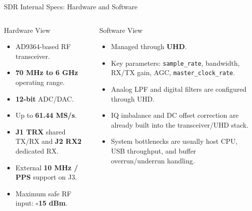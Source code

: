 \documentclass{beamer}
\begin{document}
\begin{frame}{SDR Internal Specs: Hardware and Software}
    \scriptsize
    \begin{columns}[T]
        \begin{block}{Hardware View}
            \begin{itemize}
                \item AD9364-based RF transceiver.
                \item \textbf{70 MHz to 6 GHz} operating range.
                \item \textbf{12-bit} ADC/DAC.
                \item Up to \textbf{61.44 MS/s}.
                \item \textbf{J1 TRX} shared TX/RX and \textbf{J2 RX2} dedicated RX.
                \item External \textbf{10 MHz / PPS} support on J3.
                \item Maximum safe RF input: \textbf{-15 dBm}.
            \end{itemize}
        \end{block}

        \begin{block}{Software View}
            \begin{itemize}
                \item Managed through \textbf{UHD}.
                \item Key parameters: \texttt{sample\_rate}, bandwidth, RX/TX gain, AGC, \texttt{master\_clock\_rate}.
                \item Analog LPF and digital filters are configured through UHD.
                \item IQ imbalance and DC offset correction are already built into the transceiver/UHD stack.
                \item System bottlenecks are usually host CPU, USB throughput, and buffer overrun/underrun handling.
            \end{itemize}
        \end{block}
    \end{columns}
\end{frame}
\end{document}
